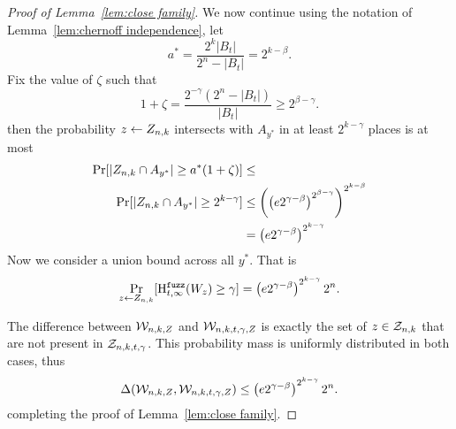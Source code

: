 \begin{proof}[Proof of Lemma~\ref{lem:close family}]
\noindent
We now continue using the notation of Lemma~\ref{lem:chernoff independence}, let 
\[
a^* =\frac{2^k|B_t|}{2^n - |B_t|}=2^{k-\beta}.
\]
Fix the value of $\zeta$ such that 
\[1+\zeta = \frac{2^{-\gamma}(2^n - |B_t|)}{|B_t|} \ge 2^{\beta-\gamma}. \]
then the probability $z\leftarrow Z_{n,k}$ intersects with $A_{y^*}$ in at least $2^{k-\gamma}$ places is at most 
\begin{align*}
\Pr[|Z_{n,k} \cap A_{y^*}| \ge a^*(1+\zeta)] &\le \\
\Pr[| Z_{n,k} \cap A_{y^*} | \ge 2^{k-\gamma}] &\le \left(\left(e2^{\gamma-\beta}\right)^{2^{\beta-\gamma}}\right)^{2^{k-\beta}} \\&= \left(e2^{\gamma-\beta}\right)^{2^{k-\gamma}}
\end{align*}
Now we consider a union bound across all $y^*$.  That is
\[
\Pr_{z\leftarrow Z_{n,k} }[\mathrm{H}^{\mathtt{fuzz}}_{t,\infty}(W_z)\ge \gamma] = \left(e2^{\gamma-\beta}\right)^{2^{k-\gamma}}2^n.
\]

The difference between $\mathcal{W}_{n,k, Z}$ and $\mathcal{W}_{n,k,t,\gamma, Z}$ is exactly the set of $z\in\mathcal{Z}_{n,k}$ that are not present in $\mathcal{Z}_{n,k,t,\gamma}$.  This probability mass is uniformly distributed in both cases, thus 
\[
\Delta(\mathcal{W}_{n,k, Z}, \mathcal{W}_{n,k,t,\gamma, Z}) \le \left(e2^{\gamma-\beta}\right)^{2^{k-\gamma}}2^n.
\]
completing the proof of Lemma~\ref{lem:close family}.
\end{proof}

